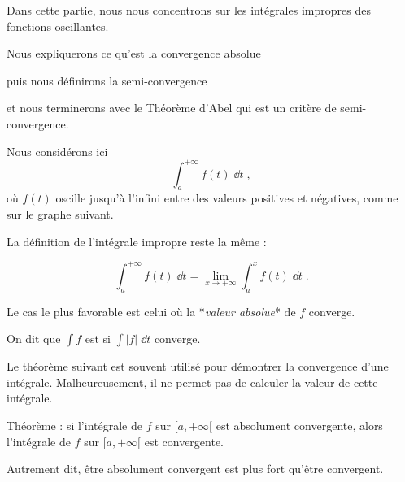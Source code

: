 







\debuttexte




\diapo

Dans cette partie, nous nous concentrons sur les intégrales 
impropres des fonctions oscillantes.

\change

\change

Nous  expliquerons ce qu'est la convergence absolue

\change

puis nous définirons la semi-convergence

\change

et nous terminerons avec le Théorème d'Abel 
qui est un critère de semi-convergence.


\diapo

Nous considérons ici $$\int_a^{+\infty} f(t)\;\dd t\; ,$$ où $f(t)$
oscille jusqu'à l'infini entre des valeurs positives 
et négatives, comme sur le graphe suivant.

\change

La définition de l'intégrale impropre reste la même :

$$\int_a^{+\infty} f(t)\;\dd t = \lim_{x\rightarrow +\infty} \int_a^x f(t)\;\dd t\;.$$
 
\diapo

Le cas le plus favorable est celui où la *\emph{valeur absolue}* 
de $f$ converge. 

On dit que $\int f$ est  si 
$\int \big|f\big|\;\dd t$ converge.

\change 
Le théorème suivant est souvent utilisé pour démontrer la
convergence d'une intégrale. Malheureusement, il ne permet pas de
calculer la valeur de cette intégrale.

Théorème : si l'intégrale de $f$ sur $[a,+\infty[$ est 
absolument convergente, alors l'intégrale de $f$ sur 
$[a,+\infty[$ est convergente.

Autrement dit, être absolument convergent est 
plus fort qu'être convergent.

